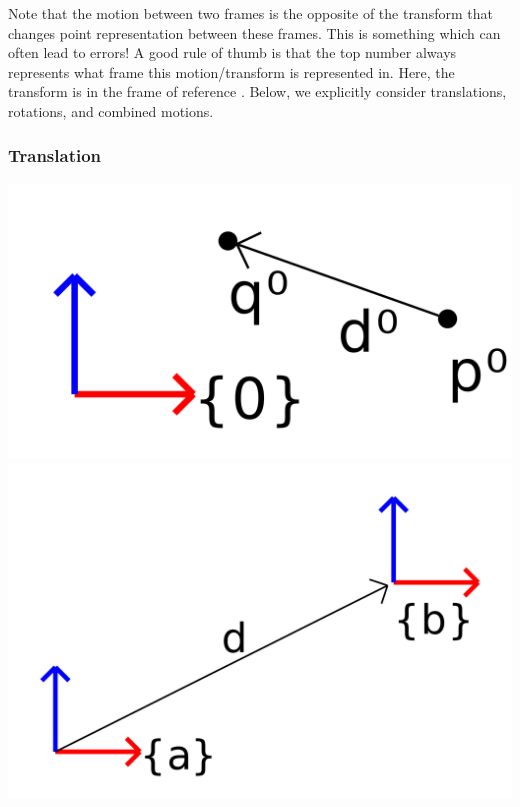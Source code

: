 \documentclass{16384_doc}
\begin{document}
\vspace{0.2in}
Note that the motion between two frames is the opposite of the transform that
changes point representation between these frames. This is something which can
often lead to errors! A good rule of thumb is that the top number always represents what
frame this motion/transform is represented in.  Here, the transform is in
the frame of reference . Below, we explicitly consider translations, rotations, and combined motions.

\subsubsection{Translation}

\begin{center}
\includegraphics[scale=0.09]{generated_figures/bg_translation_motion.png}
\hspace{0.5in}
\includegraphics[scale=0.09]{generated_figures/bg_translation.png}
\end{center}
\end{document}
